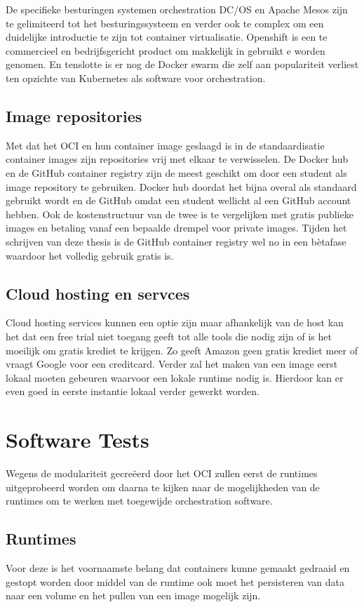 De specifieke besturingen systemen orchestration DC/OS en Apache Mesos zijn te gelimiteerd tot het besturingssysteem en verder ook te complex om een duidelijke introductie te zijn tot container virtualisatie.  Openshift is een te commercieel en bedrijfsgericht product om makkelijk in gebruikt e worden genomen. En tenslotte is er nog de Docker swarm die zelf aan populariteit verliest ten opzichte van Kubernetes als software voor orchestration.


\subsection{Image repositories}
Met dat het OCI en hun container image geslaagd is in de standaardisatie container images zijn repositories vrij met elkaar te verwisselen. De Docker hub en de GitHub container registry zijn de meest geschikt om door een student als image repository te gebruiken.  Docker hub doordat het bijna overal als standaard gebruikt wordt en de GitHub omdat een student wellicht al een GitHub account hebben. Ook de kostenstructuur van de twee is te vergelijken met gratis publieke images en betaling vanaf een bepaalde drempel voor private images. Tijden het schrijven van deze thesis is de GitHub container registry wel no in een bètafase waardoor het volledig gebruik gratis is.

\subsection{Cloud hosting en servces}
Cloud hosting services kunnen een optie zijn maar afhankelijk van de host kan het dat een free trial niet toegang geeft tot alle tools die nodig zijn of is het moeilijk om gratis krediet te krijgen. Zo geeft Amazon geen gratis krediet meer of vraagt Google voor een creditcard.  Verder zal het maken van een image eerst lokaal moeten gebeuren waarvoor een lokale runtime nodig is. Hierdoor kan er even goed in eerste instantie lokaal verder gewerkt worden.

\section{Software Tests}
Wegens de modulariteit gecreëerd door het OCI zullen eerst de runtimes uitgeprobeerd worden om daarna te kijken naar de mogelijkheden van de runtimes om te werken met toegewijde orchestration software.

\subsection{Runtimes}
Voor deze is het voornaamste belang dat containers kunne gemaakt gedraaid en gestopt worden door middel van de runtime ook moet het persisteren van data naar een volume en het pullen van een image mogelijk zijn.

